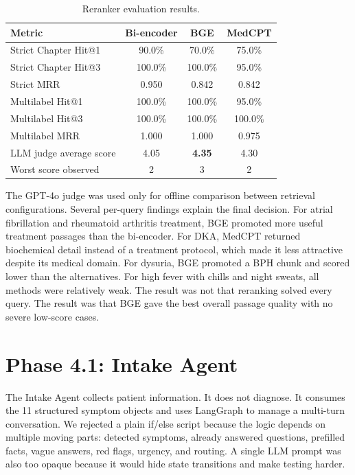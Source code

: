 \begin{table}[htbp]
\centering
\caption{Reranker evaluation results.}
\label{tab:reranker_results}
\begin{tabular}{p{} c c c}
\toprule
\textbf{Metric} & \textbf{Bi-encoder} & \textbf{BGE} & \textbf{MedCPT}\\
\midrule
Strict Chapter Hit@1 & 90.0\% & 70.0\% & 75.0\%\\
Strict Chapter Hit@3 & 100.0\% & 100.0\% & 95.0\%\\
Strict MRR & 0.950 & 0.842 & 0.842\\
Multilabel Hit@1 & 100.0\% & 100.0\% & 95.0\%\\
Multilabel Hit@3 & 100.0\% & 100.0\% & 100.0\%\\
Multilabel MRR & 1.000 & 1.000 & 0.975\\
LLM judge average score & 4.05 & \textbf{4.35} & 4.30\\
Worst score observed & 2 & 3 & 2\\
\bottomrule
\end{tabular}
\end{table}

The GPT-4o judge was used only for offline comparison between retrieval configurations. Several per-query findings explain the final decision. For atrial fibrillation and rheumatoid arthritis treatment, BGE promoted more useful treatment passages than the bi-encoder. For DKA, MedCPT returned biochemical detail instead of a treatment protocol, which made it less attractive despite its medical domain. For dysuria, BGE promoted a BPH chunk and scored lower than the alternatives. For high fever with chills and night sweats, all methods were relatively weak. The result was not that reranking solved every query. The result was that BGE gave the best overall passage quality with no severe low-score cases.

\section{Phase 4.1: Intake Agent}

The Intake Agent collects patient information. It does not diagnose. It consumes the 11 structured symptom objects and uses LangGraph to manage a multi-turn conversation. We rejected a plain if/else script because the logic depends on multiple moving parts: detected symptoms, already answered questions, prefilled facts, vague answers, red flags, urgency, and routing. A single LLM prompt was also too opaque because it would hide state transitions and make testing harder.

